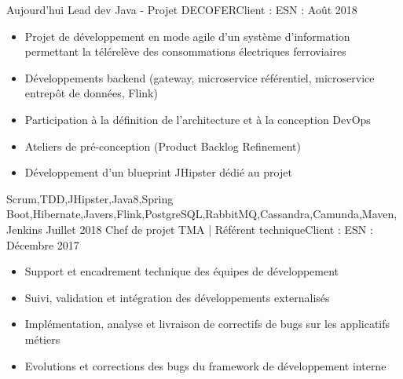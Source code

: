 %
%
%

\begin{experiences}
  \experience
    {Aujourd'hui}   {Lead dev Java - Projet DECOFER}{Client : }{ESN : }
    {Août 2018} {
                      \begin{itemize}
                        \item Projet de développement en mode agile d'un système d'information permettant la télérelève des consommations électriques ferroviaires
                        \item Développements backend (gateway, microservice référentiel, microservice entrepôt de données, Flink)
                        \item Participation à la définition de l'architecture et à la conception DevOps
                        \item Ateliers de pré-conception (Product Backlog Refinement)
                        \item Développement d'un blueprint JHipster dédié au projet
                      \end{itemize}
                    }
                    {Scrum,TDD,JHipster,Java8,Spring Boot,Hibernate,Javers,Flink,PostgreSQL,RabbitMQ,Cassandra,Camunda,Maven,Jenkins}
  \emptySeparator
  \experience
    {Juillet 2018} {Chef de projet TMA | Référent technique}{Client : }{ESN : }
    {Décembre 2017}    {
                      \begin{itemize}
                        \item Support et encadrement technique des équipes de développement
                        \item Suivi, validation et intégration des développements externalisés
                        \item Implémentation, analyse et livraison de correctifs de bugs sur les applicatifs métiers
                        \item Evolutions et corrections des bugs du framework de développement interne

\end{itemize}}
\end{experiences}
